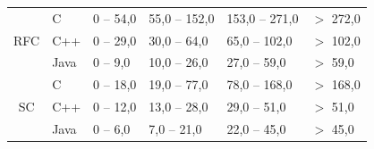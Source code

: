 \begin{table}[H]
\begin{tabular}{| c | l | l | l | l | l |}
\multirow{3}{*}{RFC}   & C      & 0 -- 54,0  & 55,0 -- 152,0 & 153,0 -- 271,0 & $>$ 272,0 \\
                       & C++     & 0 -- 29,0  & 30,0 -- 64,0  & 65,0 -- 102,0 & $>$ 102,0 \\
                       & Java      & 0 -- 9,0   & 10,0 -- 26,0 & 27,0 -- 59,0 & $>$ 59,0  \\
    \hline
\multirow{3}{*}{SC}    & C         & 0 -- 18,0  & 19,0 -- 77,0 & 78,0 -- 168,0 & $>$ 168,0 \\
                       & C++       & 0 -- 12,0  & 13,0 -- 28,0 & 29,0 -- 51,0  & $>$ 51,0  \\
                       & Java      & 0 -- 6,0   & 7,0 -- 21,0  & 22,0 -- 45,0  & $>$ 45,0  \\
    \hline
  \end{tabular}
  \label{valores-frequentes}
\end{table}

%
%
%
%
%
%
